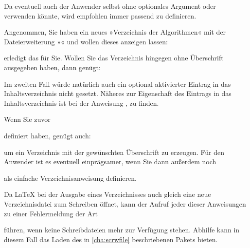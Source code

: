Da eventuell auch der Anwender selbst
 ohne optionales Argument oder  verwenden
könnte, wird empfohlen  immer
passend zu definieren.
\begin{Example}
  Angenommen, Sie haben ein neues »Verzeichnis der Algorithmen« mit der
  Dateierweiterung »« und wollen dieses anzeigen lassen:
\begin{lstcode}
\end{lstcode}
  erledigt das für Sie. Wollen Sie das Verzeichnis hingegen ohne Überschrift
  ausgegeben haben, dann genügt:
\begin{lstcode}
\end{lstcode}
  Im zweiten Fall würde natürlich auch ein optional aktivierter Eintrag in das
  Inhaltsverzeichnis nicht gesetzt. Näheres zur Eigenschaft des Eintrags in
  das Inhaltsverzeichnis ist bei der Anweisung
  ,  zu
  finden.

  Wenn Sie zuvor
\begin{lstcode}
  \newcommand*{\listofloaname}{%
    Verzeichnis der Algorithmen%
  }
\end{lstcode}
  definiert haben, genügt auch:
\begin{lstcode}
\end{lstcode}
  um ein Verzeichnis mit der gewünschten Überschrift zu erzeugen. Für den
  Anwender ist es eventuell einprägsamer, wenn Sie dann außerdem noch
\begin{lstcode}
  \newcommand*{\listofalgorithms}{\listoftoc{loa}}
\end{lstcode}
  als einfache Verzeichnisanweisung definieren.
\end{Example}

Da \LaTeX{} bei der Ausgabe eines Verzeichnisses auch
gleich eine neue Verzeichnisdatei zum Schreiben öffnet, kann der Aufruf jeder
dieser Anweisungen zu einer Fehlermeldung der Art
führen, wenn keine Schreibdateien mehr zur Verfügung stehen. Abhilfe kann in
diesem Fall das Laden des in \autoref{cha:scrwfile} beschriebenen Pakets
bieten.

